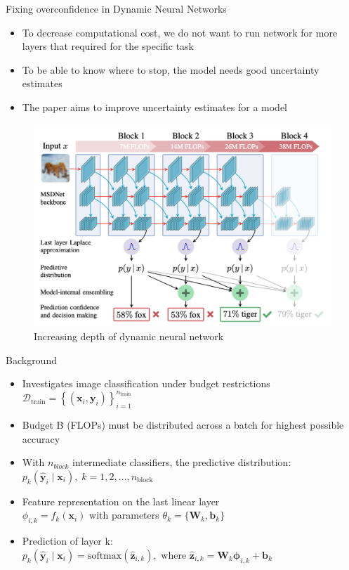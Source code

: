 \documentclass[aspectratio=169,xcolor=dvipsnames]{beamer}
\begin{document}
\begin{frame}{Fixing overconfidence in Dynamic Neural Networks}
\cite{meronen_fixing_2023}
    \begin{itemize}
        \item To decrease computational cost, we do not want to run network for more layers that required for the specific task
        \item To be able to know where to stop, the model needs good uncertainty estimates
        \item The paper aims to improve uncertainty estimates for a model
    \end{itemize}
    \begin{figure}
        \centering
        \includegraphics[width=0.4\linewidth]{figs/Screenshot 2025-04-08 at 15.02.28.png}
        \caption{Increasing depth of dynamic neural network}
        \label{fig:enter-label}
    \end{figure}
\end{frame}

\begin{frame}{Background}

    \begin{itemize}
        \item Investigates image classification under budget restrictions \\
              \(\mathcal{D}_{\text{train}} = \left\{ (\mathbf{x}_i, \mathbf{y}_i) \right\}_{i=1}^{n_{\text{train}}}\)
        \item Budget B (FLOPs) must be distributed across a batch for highest possible accuracy
        \item With $n_{block}$ intermediate classifiers, the predictive distribution: \\
              \( p_k(\hat{\mathbf{y}}_i \mid \mathbf{x}_i),\; k = 1, 2, \ldots, n_{\text{block}} \)
        \item Feature representation on the last linear layer \\
              \( \phi_{i,k} = f_k(\mathbf{x}_i) \) with parameters \( \theta_k = \{ \mathbf{W}_k, \mathbf{b}_k \} \)
        \item Prediction of layer k: \\
              \( p_k(\hat{\mathbf{y}}_i \mid \mathbf{x}_i) = \text{softmax}(\hat{\mathbf{z}}_{i,k}), \text{ where } \hat{\mathbf{z}}_{i,k} = \mathbf{W}_k \boldsymbol{\phi}_{i,k} + \mathbf{b}_k \)

    \end{itemize}

\end{frame}
\end{document}
